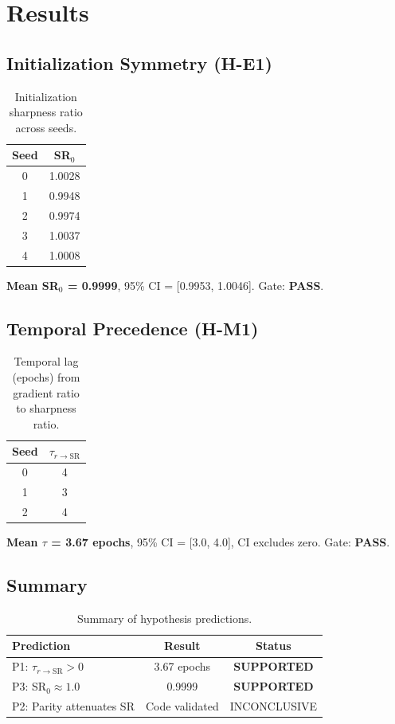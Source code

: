 \section{Results}

\subsection{Initialization Symmetry (H-E1)}

\begin{table}[h]
\centering
\begin{tabular}{@{}cc@{}}
\toprule
Seed & SR$_0$ \\
\midrule
0 & 1.0028 \\
1 & 0.9948 \\
2 & 0.9974 \\
3 & 1.0037 \\
4 & 1.0008 \\
\bottomrule
\end{tabular}
\caption{Initialization sharpness ratio across seeds.}
\label{tab:init_sr}
\end{table}

\textbf{Mean SR$_0$ = 0.9999}, 95\% CI = [0.9953, 1.0046]. Gate: \textbf{PASS}.

\subsection{Temporal Precedence (H-M1)}

\begin{table}[h]
\centering
\begin{tabular}{@{}cc@{}}
\toprule
Seed & $\tau_{r \rightarrow \text{SR}}$ \\
\midrule
0 & 4 \\
1 & 3 \\
2 & 4 \\
\bottomrule
\end{tabular}
\caption{Temporal lag (epochs) from gradient ratio to sharpness ratio.}
\label{tab:temporal_lag}
\end{table}

\textbf{Mean $\tau$ = 3.67 epochs}, 95\% CI = [3.0, 4.0], CI excludes zero. Gate: \textbf{PASS}.

\subsection{Summary}

\begin{table}[h]
\centering
\begin{tabular}{@{}lcc@{}}
\toprule
Prediction & Result & Status \\
\midrule
P1: $\tau_{r \rightarrow \text{SR}} > 0$ & 3.67 epochs & \textbf{SUPPORTED} \\
P3: SR$_0 \approx 1.0$ & 0.9999 & \textbf{SUPPORTED} \\
P2: Parity attenuates SR & Code validated & INCONCLUSIVE \\
\bottomrule
\end{tabular}
\caption{Summary of hypothesis predictions.}
\label{tab:summary}
\end{table}
